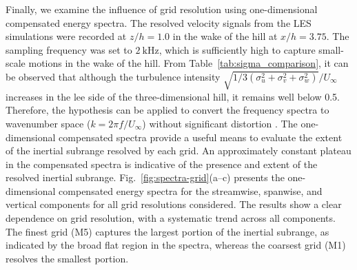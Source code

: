 \documentclass[%
superscriptaddress,
 amsmath,amssymb,
pra,
showkeys,
]{revtex4-2}
\newcommand{\solidline}[2][0.9em]{%
  \textcolor{#2}{\rule[0.5ex]{#1}{0.6pt}}%
}
\newcommand{\dottedline}[2][0.9em]{%
  \textcolor{#2}{\rule[0.5ex]{0.1em}{0.6pt}\hspace{0.25em}\rule[0.5ex]{0.1em}{0.6pt}\hspace{0.25em}\rule[0.5ex]{0.1em}{0.6pt}}%
}
\newcommand{\dashdotline}[2][0.9em]{%
  \textcolor{#2}{\rule[0.5ex]{0.4em}{0.6pt}\hspace{0.25em}\rule[0.5ex]{0.1em}{0.6pt}\hspace{0.25em}\rule[0.5ex]{0.4em}{0.6pt}}%
}
\newcommand{\dashedline}[2][0.9em]{%
  \textcolor{#2}{\rule[0.5ex]{0.4em}{0.6pt}\hspace{0.25em}\rule[0.5ex]{0.4em}{0.6pt}}%
}
\begin{document}


Finally, we examine the influence of grid resolution using one-dimensional compensated energy spectra. The resolved velocity signals from the LES simulations were recorded at $z/h = 1.0$ in the wake of the hill at $x/h = 3.75$. The sampling frequency was set to $2~\mathrm{kHz}$, which is sufficiently high to capture small-scale motions in the wake of the hill. From Table~\ref{tab:sigma_comparison}, it can be observed that although the turbulence intensity $\sqrt{1/3(\sigma_u^2 + \sigma_v^2 + \sigma_w^2)}/U_\infty$ increases in the lee side of the three-dimensional hill, it remains well below 0.5. Therefore, the \citet{taylor1938spectrum} hypothesis can be applied to convert the frequency spectra to wavenumber space ($k = 2\pi f / U_\infty$) without significant distortion \citep{katul1994intermittency}. The one-dimensional compensated spectra provide a useful means to evaluate the extent of the inertial subrange resolved by each grid. An approximately constant plateau in the compensated spectra is indicative of the presence and extent of the resolved inertial subrange. Fig.~\ref{fig:spectra-grid}(a--c) presents the one-dimensional compensated energy spectra for the streamwise, spanwise, and vertical components for all grid resolutions considered. The results show a clear dependence on grid resolution, with a systematic trend across all components. The finest grid (M5) captures the largest portion of the inertial subrange, as indicated by the broad flat region in the spectra, whereas the coarsest grid (M1) resolves the smallest portion.
\end{document}
